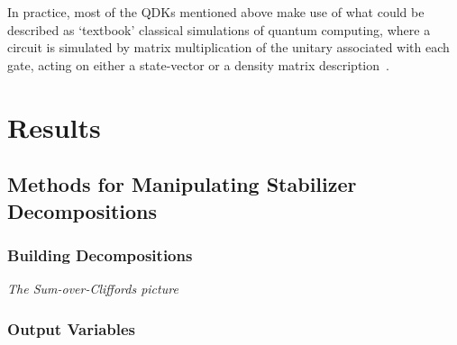 In practice, most of the QDKs mentioned above make use of what could be described as `textbook' classical simulations of quantum computing, where a circuit is simulated by matrix multiplication of the unitary associated with each gate, acting on either a state-vector or a density matrix description~\cite{Nielsen2000}.
\section{Results}
\subsection{Methods for Manipulating Stabilizer Decompositions}
\subsubsection*{Building Decompositions}
\large{\itshape{The Sum-over-Cliffords picture}}\par
\subsubsection*{Output Variables}
